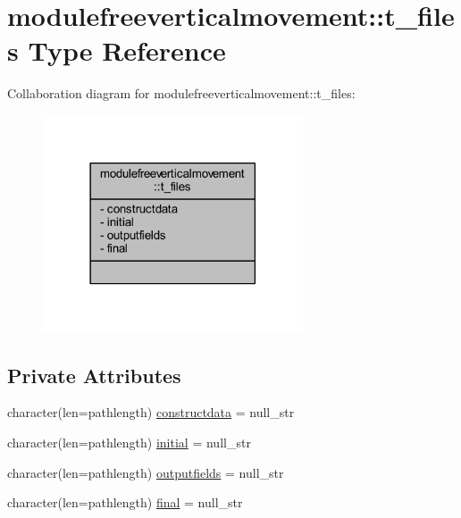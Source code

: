 \hypertarget{structmodulefreeverticalmovement_1_1t__files}{}\section{modulefreeverticalmovement\+:\+:t\+\_\+files Type Reference}
\label{structmodulefreeverticalmovement_1_1t__files}


Collaboration diagram for modulefreeverticalmovement\+:\+:t\+\_\+files\+:\nopagebreak
\begin{figure}[H]
\begin{center}
\leavevmode
\includegraphics[width=218pt]{structmodulefreeverticalmovement_1_1t__files__coll__graph}
\end{center}
\end{figure}
\subsection*{Private Attributes}
\begin{DoxyCompactItemize}
\item 
character(len=pathlength) \mbox{\hyperlink{structmodulefreeverticalmovement_1_1t__files_ab57a5d77b71117f3f8973ddd6acf6db9}{constructdata}} = null\+\_\+str
\item 
character(len=pathlength) \mbox{\hyperlink{structmodulefreeverticalmovement_1_1t__files_acb4f8351399efabd601445f6c7cbc4be}{initial}} = null\+\_\+str
\item 
character(len=pathlength) \mbox{\hyperlink{structmodulefreeverticalmovement_1_1t__files_a2bf37638654cc5997c92088415f2da2d}{outputfields}} = null\+\_\+str
\item 
character(len=pathlength) \mbox{\hyperlink{structmodulefreeverticalmovement_1_1t__files_afdd912bedc761fb8cf8b608b5be8f467}{final}} = null\+\_\+str
\end{DoxyCompactItemize}


